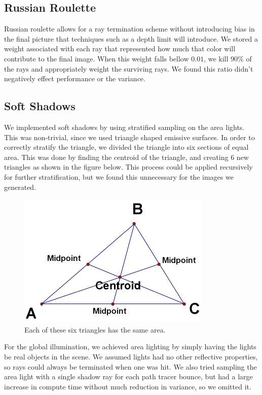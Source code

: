 \documentclass[11pt]{article}
\begin{document}
\subsection{Russian Roulette}
Russian roulette allows for a ray termination scheme without introducing bias in the final picture that techniques such as a depth limit will introduce. We stored a weight associated with each ray that represented how much that color will contribute to the final image. When this weight falls bellow $0.01$, we kill $90\%$ of the rays and appropriately weight the surviving rays. We found this ratio didn't negatively effect performance or the variance.

\subsection{Soft Shadows}
We implemented soft shadows by using stratified sampling on the area lights. This was non-trivial, since we used triangle shaped emissive surfaces. In order to correctly stratify the triangle, we divided the triangle into six sections of equal area. This was done by finding the centroid of the triangle, and creating 6 new triangles as shown in the figure below. This process could be applied recursively for further stratification, but we found this unnecessary for the images we generated.

\begin{figure}
	\begin{center}
		\includegraphics[width=.5\linewidth]{figs/centroid}
		\caption{Each of these six triangles has the same area.}
	\end{center}
\end{figure}

For the global illumination, we achieved area lighting by simply having the lights be real objects in the scene. We assumed lights had no other reflective properties, so rays could always be terminated when one was hit. We also tried sampling the area light with a single shadow ray for each path tracer bounce, but had a large increase in compute time without much reduction in variance, so we omitted it.
\end{document}

